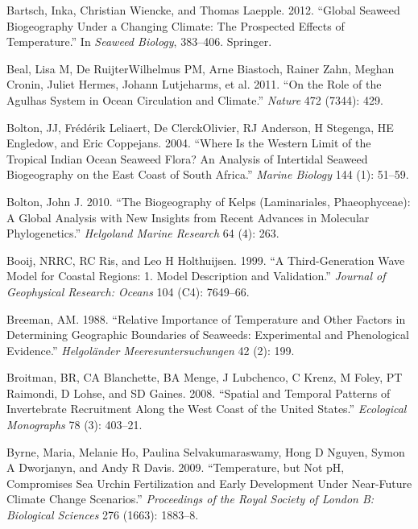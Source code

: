 \documentclass[10pt,a4paper,]{article}
\begin{document}
\leavevmode\hypertarget{ref-Bartsch2012}{}%
Bartsch, Inka, Christian Wiencke, and Thomas Laepple. 2012. ``Global
Seaweed Biogeography Under a Changing Climate: The Prospected Effects of
Temperature.'' In \emph{Seaweed Biology}, 383--406. Springer.

\leavevmode\hypertarget{ref-Beal2011}{}%
Beal, Lisa M, De RuijterWilhelmus PM, Arne Biastoch, Rainer Zahn, Meghan
Cronin, Juliet Hermes, Johann Lutjeharms, et al. 2011. ``On the Role of
the Agulhas System in Ocean Circulation and Climate.'' \emph{Nature} 472
(7344): 429.

\leavevmode\hypertarget{ref-Bolton2004}{}%
Bolton, JJ, Frédérik Leliaert, De ClerckOlivier, RJ Anderson, H
Stegenga, HE Engledow, and Eric Coppejans. 2004. ``Where Is the Western
Limit of the Tropical Indian Ocean Seaweed Flora? An Analysis of
Intertidal Seaweed Biogeography on the East Coast of South Africa.''
\emph{Marine Biology} 144 (1): 51--59.

\leavevmode\hypertarget{ref-Bolton2010}{}%
Bolton, John J. 2010. ``The Biogeography of Kelps (Laminariales,
Phaeophyceae): A Global Analysis with New Insights from Recent Advances
in Molecular Phylogenetics.'' \emph{Helgoland Marine Research} 64 (4):
263.

\leavevmode\hypertarget{ref-Booij1999}{}%
Booij, NRRC, RC Ris, and Leo H Holthuijsen. 1999. ``A Third-Generation
Wave Model for Coastal Regions: 1. Model Description and Validation.''
\emph{Journal of Geophysical Research: Oceans} 104 (C4): 7649--66.

\leavevmode\hypertarget{ref-Breeman1988}{}%
Breeman, AM. 1988. ``Relative Importance of Temperature and Other
Factors in Determining Geographic Boundaries of Seaweeds: Experimental
and Phenological Evidence.'' \emph{Helgoländer Meeresuntersuchungen} 42
(2): 199.

\leavevmode\hypertarget{ref-Broitman2008}{}%
Broitman, BR, CA Blanchette, BA Menge, J Lubchenco, C Krenz, M Foley, PT
Raimondi, D Lohse, and SD Gaines. 2008. ``Spatial and Temporal Patterns
of Invertebrate Recruitment Along the West Coast of the United States.''
\emph{Ecological Monographs} 78 (3): 403--21.

\leavevmode\hypertarget{ref-Byrne2009}{}%
Byrne, Maria, Melanie Ho, Paulina Selvakumaraswamy, Hong D Nguyen, Symon
A Dworjanyn, and Andy R Davis. 2009. ``Temperature, but Not pH,
Compromises Sea Urchin Fertilization and Early Development Under
Near-Future Climate Change Scenarios.'' \emph{Proceedings of the Royal
Society of London B: Biological Sciences} 276 (1663): 1883--8.
\end{document}
